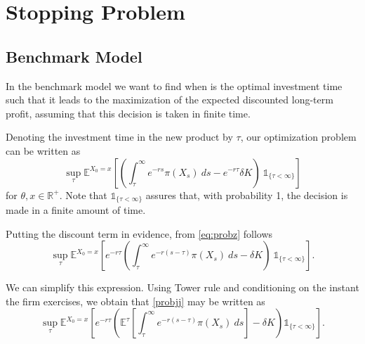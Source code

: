 \section{Stopping Problem}
\label{section:1_theory}



\subsection{Benchmark Model}
\label{subsec:1_bm}

In the benchmark model we want to find when is the optimal investment time such that it leads to the maximization of the expected discounted long-term profit, assuming that this decision is taken in finite time.



Denoting the investment time in the new product by $\tau$, our optimization problem can be written as 
\begin{equation}
\sup_\tau \mathds{E}^{X_0=x} \left[ \left( \int_\tau^\infty e^{-rs} \pi(X_s)\ ds - e^{-r \tau} \delta K \right) \ \mathds{1}_{\{\tau<\infty\}} \right]
\label{eq:probz}
\end{equation}
for $\theta, x\in \mathds{R}^+$. Note that $ \mathds{1}_{\{\tau<\infty\}}$ assures that, with probability 1, the decision is made in a finite amount of time.

Putting the discount term in evidence, from \eqref{eq:probz} follows
\begin{equation}
\sup_\tau \mathds{E}^{X_0=x} \left[e^{-r\tau }\left( \int_\tau^\infty e^{-r(s-\tau)} \pi(X_s)\ ds -\delta K \right) \ \mathds{1}_{\{\tau<\infty\}} \right].
\label{probjj}
\end{equation}

We can simplify this expression. Using Tower rule and conditioning on the instant the firm exercises, we obtain that \eqref{probjj} may be written as
\begin{equation}
\sup_\tau \mathds{E}^{X_0=x}\left[ e^{- r\tau} \left( \mathds{E}^{\tau}\left[  \int_\tau^\infty e^{-r(s-\tau) }\pi(X_s)\ ds  \right] -\delta K\right) \mathds{1}_{\{\tau<\infty\}} \right].
\label{eq:probm}
\end{equation}

